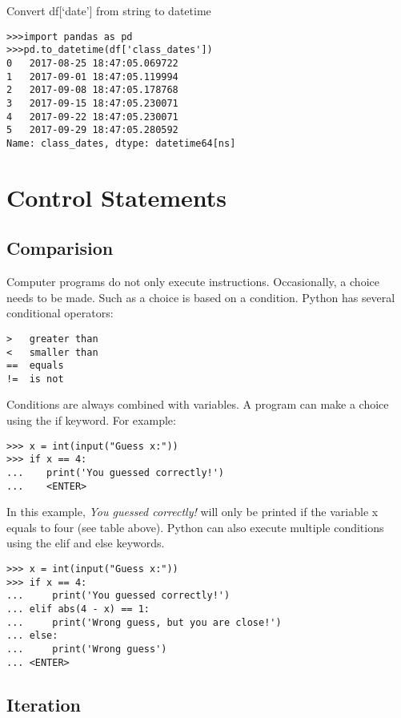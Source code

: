 Convert df{[}`date'{]} from string to datetime

\begin{verbatim}
>>>import pandas as pd
>>>pd.to_datetime(df['class_dates'])
0   2017-08-25 18:47:05.069722
1   2017-09-01 18:47:05.119994
2   2017-09-08 18:47:05.178768
3   2017-09-15 18:47:05.230071
4   2017-09-22 18:47:05.230071
5   2017-09-29 18:47:05.280592
Name: class_dates, dtype: datetime64[ns]
\end{verbatim}

\section{Control Statements}\label{control-statements}

\subsection{Comparision}\label{comparision}

Computer programs do not only execute instructions. Occasionally, a
choice needs to be made. Such as a choice is based on a condition.
Python has several conditional operators:

\begin{verbatim}
>   greater than
<   smaller than
==  equals
!=  is not
\end{verbatim}

Conditions are always combined with variables. A program can make a
choice using the if keyword. For example:

\begin{verbatim}
>>> x = int(input("Guess x:"))
>>> if x == 4:
...    print('You guessed correctly!')
...    <ENTER>
\end{verbatim}

In this example, \emph{You guessed correctly!} will only be printed if
the variable x equals to four (see table above). Python can also execute
multiple conditions using the elif and else keywords.

\begin{verbatim}
>>> x = int(input("Guess x:"))
>>> if x == 4:
...     print('You guessed correctly!')
... elif abs(4 - x) == 1:
...     print('Wrong guess, but you are close!')
... else:
...     print('Wrong guess')
... <ENTER>
\end{verbatim}

\subsection{Iteration}\label{iteration}

